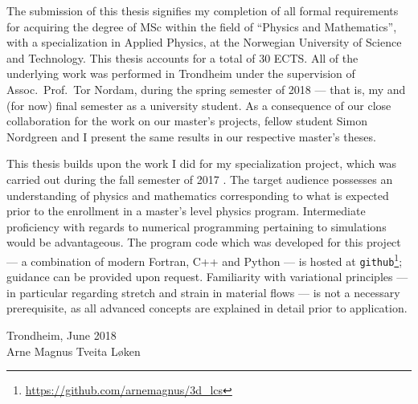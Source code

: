 The submission of this thesis signifies my completion of all formal
requirements for acquiring the degree of MSc within the field of ``Physics and
Mathematics'', with a specialization in Applied Physics, at the Norwegian
University of Science and Technology. This thesis accounts for a total of 30
ECTS\@. All of the underlying work was performed in Trondheim under the
supervision of Assoc.\ Prof.\ Tor Nordam, during the spring semester of 2018 ---
that is, my  and (for now) final semester as a university student. As a
consequence of our close collaboration for the work on our master's projects,
fellow student Simon Nordgreen and I present the same results in our respective
master's theses.

This thesis builds upon the work I did for my specialization project, which was
carried out during the fall semester of 2017 \parencite{loken2017sensitivity}.
The target audience possesses an understanding of physics and mathematics
corresponding to what is expected prior to the enrollment in a master's level
physics program. Intermediate proficiency with regards to numerical programming
pertaining to simulations would be advantageous. The program code which was
developed for this project --- a combination of modern Fortran, C++ and
Python --- is hosted at
\texttt{github}\footnote{\url{https://github.com/arnemagnus/3d_lcs}}; guidance
can be provided upon request. Familiarity with variational principles --- in
particular regarding stretch and strain in material flows --- is not a
necessary prerequisite, as all advanced concepts are explained in detail prior
to application.


\begin{minipage}[t]{\textwidth}
    \begin{flushright}
    Trondheim, June 2018\\
    Arne Magnus Tveita Løken
    \end{flushright}
\end{minipage}
